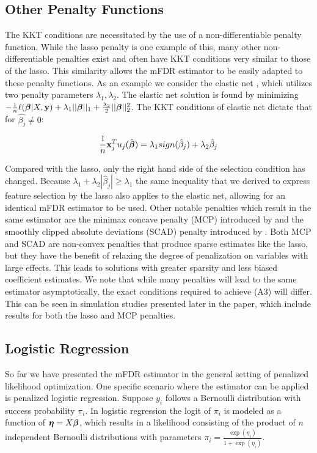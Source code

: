 \subsection{Other Penalty Functions}

The KKT conditions are necessitated by the use of a non-differentiable penalty function. While the lasso penalty is one example of this, many other non-differentiable penalties exist and often have KKT conditions very similar to those of the lasso. This similarity allows the mFDR estimator to be easily adapted to these penalty functions. As an example we consider the elastic net \citep{Elastic_Net}, which utilizes two penalty parameters $\lambda_1, \lambda_2$. The elastic net solution is found by minimizing $-\frac{1}{n} \ell(\boldsymbol{\beta}|X,\mathbf{y}) + \lambda_1 ||\boldsymbol{\beta}||_1 + \frac{\lambda_2}{2}||\boldsymbol{\beta}||_{2}^2 $. The KKT conditions of elastic net dictate that for $\hat{\beta_j} \neq 0$:

\begin{equation*}
\frac{1}{n}\mathbf{x}_{j}^T u_j(\hat{\boldsymbol{\beta}}) = \lambda_1 sign(\hat{\beta}_j) + \lambda_2 \hat{\beta}_j
\end{equation*}

Compared with the lasso, only the right hand side of the selection condition has changed. Because $\lambda_1 + \lambda_2|\hat{\beta}_j| \geq \lambda_1$ the same inequality that we derived to express feature selection by the lasso also applies to the elastic net, allowing for an identical mFDR estimator to be used. Other notable penalties which result in the same estimator are the minimax concave penalty (MCP) introduced by \citet{MCP} and the smoothly clipped absolute deviations (SCAD) penalty introduced by \citet{SCAD}. Both MCP and SCAD are non-convex penalties that produce sparse estimates like the lasso, but they have the benefit of relaxing the degree of penalization on variables with large effects. This leads to solutions with greater sparsity and less biased coefficient estimates. We note that while many penalties will lead to the same estimator asymptotically, the exact conditions required to achieve (A3) will differ. This can be seen in simulation studies presented later in the paper, which include results for both the lasso and MCP penalties.

\subsection{Logistic Regression}

So far we have presented the mFDR estimator in the general setting of penalized likelihood optimization. One specific scenario where the estimator can be applied is penalized logistic regression. Suppose $y_i$ follows a Bernoulli distribution with success probability $\pi_i$. In logistic regression the logit of $\pi_i$ is modeled as a function of $\boldsymbol{\eta} = X\boldsymbol{\beta}$, which results in a likelihood consisting of the product of $n$ independent Bernoulli distributions with parameters $\pi_i = \frac{\exp(\eta_i)} {1 + \exp(\eta_i)}$.

